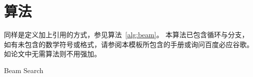 \chapter{算法}

同样是定义加上引用的方式，参见算法~\ref{alg:beam}。
本算法已包含循环与分支，如有未包含的数学符号或格式，请参阅本模板所包含的手册或询问百度必应谷歌。
如论文中无需算法则不用强加。

\begin{algorithm}
	\caption{Beam Search}
	\label{alg:beam}
	\begin{algorithmic}[1]
		\ELSE 
		\ENDIF
		\ENDWHILE
	\end{algorithmic}
\end{algorithm}